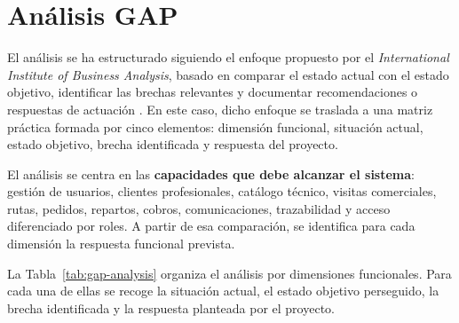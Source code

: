 \section{Análisis GAP}
\label{sec:GapAnalysis}

El análisis se ha estructurado siguiendo el enfoque propuesto por el \textit{International Institute of Business Analysis}, basado en comparar el estado actual con el estado objetivo, identificar las brechas relevantes y documentar recomendaciones o respuestas de actuación \citep{iiba-gap-analysis}. En este caso, dicho enfoque se traslada a una matriz práctica formada por cinco elementos: dimensión funcional, situación actual, estado objetivo, brecha identificada y respuesta del proyecto.

El análisis se centra en las \textbf{capacidades que debe alcanzar el sistema}: gestión de usuarios, clientes profesionales, catálogo técnico, visitas comerciales, rutas, pedidos, repartos, cobros, comunicaciones, trazabilidad y acceso diferenciado por roles. A partir de esa comparación, se identifica para cada dimensión la respuesta funcional prevista.

La Tabla~\ref{tab:gap-analysis} organiza el análisis por dimensiones funcionales. Para cada una de ellas se recoge la situación actual, el estado objetivo perseguido, la brecha identificada y la respuesta planteada por el proyecto.

